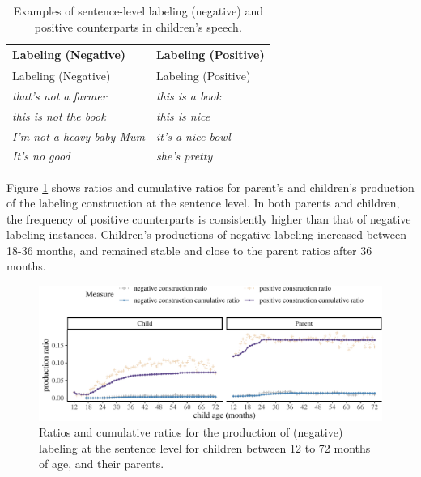 \documentclass[
  english,
  man,floatsintext]{apa6}
\begin{document}
\begin{longtable}[]{@{}ll@{}}
\caption{\label{tab:label} Examples of sentence-level labeling (negative) and positive counterparts in children's speech.}\tabularnewline
\toprule
Labeling (Negative) & Labeling (Positive) \\
\midrule
\endfirsthead
\toprule
Labeling (Negative) & Labeling (Positive) \\
\midrule
\endhead
\emph{that's not a farmer} & \emph{this is a book} \\
\emph{this is not the book} & \emph{this is nice} \\
\emph{I'm not a heavy baby Mum} & \emph{it's a nice bowl} \\
\emph{It's no good} & \emph{she's pretty} \\
\bottomrule
\end{longtable}

Figure \ref{fig:learning} shows ratios and cumulative ratios for parent's and children's production of the labeling construction at the sentence level. In both parents and children, the frequency of positive counterparts is consistently higher than that of negative labeling instances. Children's productions of negative labeling increased between 18-36 months, and remained stable and close to the parent ratios after 36 months.

\begin{figure}[H]

{\centering \includegraphics{neg_construction_article_files/figure-latex/learning-1} 

}

\caption{Ratios and cumulative ratios for the production of (negative) labeling at the sentence level for children between 12 to 72 months of age, and their parents.}\label{fig:learning}
\end{figure}
\end{document}
